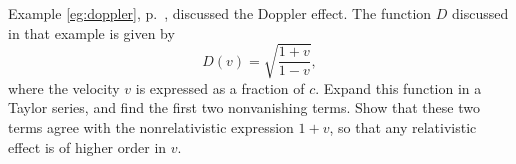 Example \ref{eg:doppler}, p.~\pageref{eg:doppler}, discussed the Doppler effect.
The function $D$ discussed in that example is given by
\begin{equation*}
  D(v) = \sqrt{\frac{1+v}{1-v}},
\end{equation*}
where the velocity $v$ is expressed as a fraction of $c$.
Expand this function in a Taylor series, and find the
first two nonvanishing terms. Show that these two terms agree with the
nonrelativistic expression $1+v$, so that any relativistic effect is of higher
order in $v$.
